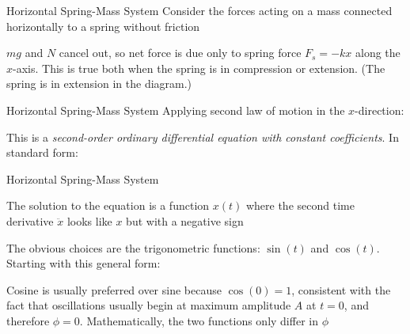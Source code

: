 \documentclass[12pt,compress,aspectratio=169]{beamer}
\begin{document}
\begin{frame}{Horizontal Spring-Mass System}
  Consider the forces acting on a mass connected horizontally to a spring
  without friction
  \begin{center}
  \end{center}
  $mg$ and $N$ cancel out, so net force is due only to spring force
  $F_s=-kx$ along the $x$-axis. This is true both when the spring is
  in compression or extension. (The spring is in extension in the diagram.)
\end{frame}



\begin{frame}{Horizontal Spring-Mass System}
  Applying second law of motion in the $x$-direction:


  This is a
  \emph{second-order ordinary differential equation with constant
    coefficients}. In standard form:

  

\end{frame}



\begin{frame}{Horizontal Spring-Mass System}

  The solution to the equation is a function $x(t)$ where the second time
  derivative $\ddot x$ looks like $x$ but with a negative sign


  The obvious choices are the trigonometric functions: $\sin(t)$ and $\cos(t)$.
  Starting with this general form:
    
  
  Cosine is usually preferred over sine because $\cos(0)=1$, consistent with
  the fact that oscillations usually begin at maximum amplitude $A$ at $t=0$,
  and therefore $\phi=0$. Mathematically, the two functions only differ in
  $\phi$
\end{frame}
\end{document}
